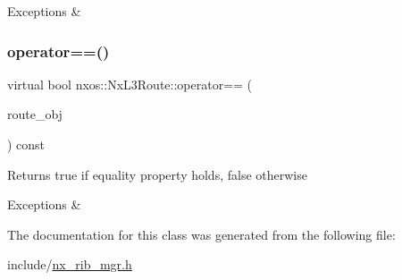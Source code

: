 \begin{DoxyExceptions}{Exceptions}
{\em } & \\
\hline
\end{DoxyExceptions}
\mbox{\label{classnxos_1_1_nx_l3_route_a1680de6899caf8fa1be3ecfad131cd25}} 
\subsubsection{\texorpdfstring{operator==()}{operator==()}}
{\footnotesize\ttfamily virtual bool nxos\+::\+Nx\+L3\+Route\+::operator== (\begin{DoxyParamCaption}\item[{\mbox{\hyperlink{classnxos_1_1_nx_l3_route}{Nx\+L3\+Route}} const \&}]{route\+\_\+obj }\end{DoxyParamCaption}) const\hspace{0.3cm}{\ttfamily [pure virtual]}}

\begin{DoxyReturn}{Returns}
true if equality property holds, false otherwise
\end{DoxyReturn}

\begin{DoxyCode}
\end{DoxyCode}



\begin{DoxyExceptions}{Exceptions}
{\em } & \\
\hline
\end{DoxyExceptions}


The documentation for this class was generated from the following file\+:\begin{DoxyCompactItemize}
\item 
include/\mbox{\hyperlink{nx__rib__mgr_8h}{nx\+\_\+rib\+\_\+mgr.\+h}}\end{DoxyCompactItemize}
